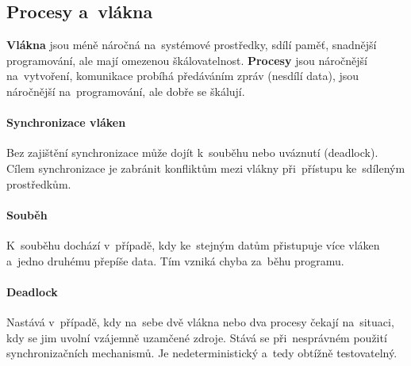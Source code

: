 \subsection{Procesy a~vlákna}

\textbf{Vlákna} jsou méně náročná na~systémové prostředky, sdílí paměť, snadnější programování, ale mají omezenou škálovatelnost. \textbf{Procesy} jsou náročnější na~vytvoření, komunikace probíhá předáváním zpráv (nesdílí data), jsou náročnější na~programování, ale dobře se škálují.

\paragraph{Synchronizace vláken}

Bez zajištění synchronizace může dojít k~souběhu nebo uváznutí (deadlock). Cílem synchronizace je zabránit konfliktům mezi vlákny při~přístupu ke~sdíleným prostředkům.

\paragraph{Souběh}

K~souběhu dochází v~případě, kdy ke~stejným datům přistupuje více vláken a~jedno druhému přepíše data. Tím vzniká chyba za~běhu programu.

\paragraph{Deadlock}

Nastává v~případě, kdy na~sebe dvě vlákna nebo dva procesy čekají na~situaci, kdy se jim uvolní vzájemně uzamčené zdroje. Stává se při~nesprávném použití synchronizačních mechanismů. Je nedeterministický a~tedy obtížně testovatelný.
